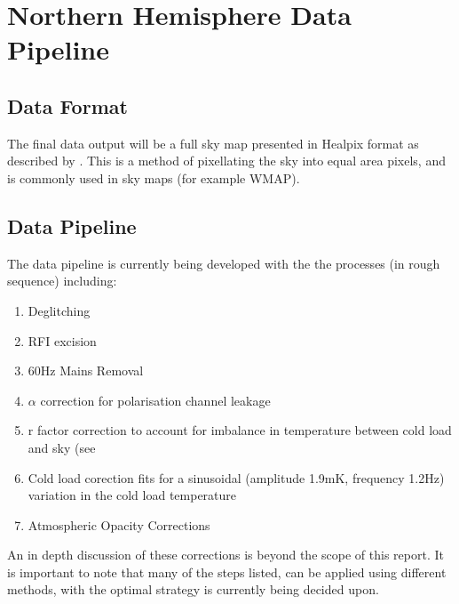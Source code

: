 \section{Northern Hemisphere Data Pipeline}

\subsection{Data Format}

The final data output will be a full sky map presented in Healpix format as described by . This is a method of pixellating the sky into equal area pixels, and is commonly used in sky maps (for example WMAP).



\subsection{Data Pipeline}


The data pipeline is currently being developed with the the processes (in rough sequence) including:

\begin{enumerate}
 \item Deglitching
 \item RFI excision
 \item 60Hz Mains Removal
  \item $\alpha$ correction for polarisation channel leakage 
 \item r factor correction to account for imbalance in temperature between cold load and sky (see \cite{Mennella:2003ii}
 \item Cold load corection fits for a sinusoidal (amplitude 1.9mK, frequency 1.2Hz) variation in the cold load temperature 
 \item Atmospheric Opacity Corrections
\end{enumerate}


An in depth discussion of these corrections is beyond the scope of this report. It is important to note that many of the steps listed, can be applied using different methods, with the optimal strategy is currently being decided upon. 

